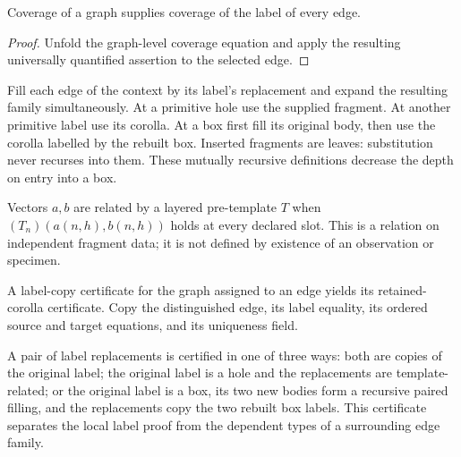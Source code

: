 \begin{lemma}
Coverage of a graph supplies coverage of the label of every edge.
\end{lemma}
\begin{proof}
Unfold the graph-level coverage equation and apply the resulting universally quantified assertion to the selected edge.
\end{proof}

\begin{definition}
Fill each edge of the context by its label's replacement and expand the resulting family simultaneously. At a primitive hole use the supplied fragment. At another primitive label use its corolla. At a box first fill its original body, then use the corolla labelled by the rebuilt box. Inserted fragments are leaves: substitution never recurses into them. These mutually recursive definitions decrease the depth on entry into a box.
\end{definition}

\begin{definition}
Vectors $a,b$ are related by a layered pre-template $T$ when $(T_n)(a(n,h),b(n,h))$ holds at every declared slot. This is a relation on independent fragment data; it is not defined by existence of an observation or specimen.
\end{definition}

\begin{definition}
A label-copy certificate for the graph assigned to an edge yields its retained-corolla certificate. Copy the distinguished edge, its label equality, its ordered source and target equations, and its uniqueness field.
\end{definition}

\begin{definition}
A pair of label replacements is certified in one of three ways: both are copies of the original label; the original label is a hole and the replacements are template-related; or the original label is a box, its two new bodies form a recursive paired filling, and the replacements copy the two rebuilt box labels. This certificate separates the local label proof from the dependent types of a surrounding edge family.
\end{definition}

